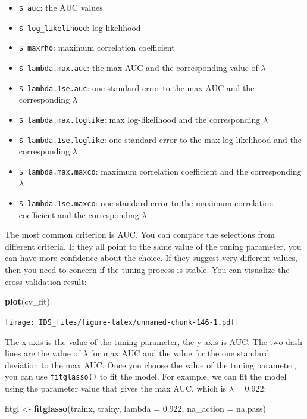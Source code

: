 \documentclass[12pt,]{krantz}
\makeatletter
\newenvironment{Shaded}{\begin{snugshade}}{\end{snugshade}}
\newcommand{\DataTypeTok}[1]{\textcolor[rgb]{0.27,0.27,0.27}{#1}}
\newcommand{\FloatTok}[1]{\textcolor[rgb]{0.06,0.06,0.06}{#1}}
\newcommand{\KeywordTok}[1]{\textcolor[rgb]{0.27,0.27,0.27}{\textbf{#1}}}
\newcommand{\NormalTok}[1]{#1}
\newcommand{\StringTok}[1]{\textcolor[rgb]{0.5,0.5,0.5}{#1}}
\providecommand{\tightlist}{%
  \setlength{\itemsep}{0pt}\setlength{\parskip}{0pt}}
\newenvironment{kframe}{%
\medskip{}
\setlength{\fboxsep}{.8em}
 \def\at@end@of@kframe{}%
 \ifinner\ifhmode%
  \def\at@end@of@kframe{\end{minipage}}%
  \begin{minipage}{\columnwidth}%
 \fi\fi%
 \def\FrameCommand##1{\hskip\@totalleftmargin \hskip-\fboxsep
 \colorbox{shadecolor}{##1}\hskip-\fboxsep
     \hskip-\linewidth \hskip-\@totalleftmargin \hskip\columnwidth}%
 \MakeFramed {\advance\hsize-\width
   \@totalleftmargin\z@ \linewidth\hsize
   \@setminipage}}%
 {\par\unskip\endMakeFramed%
 \at@end@of@kframe}
\renewenvironment{Shaded}{\begin{kframe}}{\end{kframe}}
\makeatother
\begin{document}
\begin{itemize}
\tightlist
\item
  \texttt{\$\ auc}: the AUC values
\item
  \texttt{\$\ log\_likelihood}: log-likelihood
\item
  \texttt{\$\ maxrho}: maximum correlation coefficient
\item
  \texttt{\$\ lambda.max.auc}: the max AUC and the corresponding value of \(\lambda\)
\item
  \texttt{\$\ lambda.1se.auc}: one standard error to the max AUC and the corresponding \(\lambda\)
\item
  \texttt{\$\ lambda.max.loglike}: max log-likelihood and the corresponding \(\lambda\)
\item
  \texttt{\$\ lambda.1se.loglike}: one standard error to the max log-likelihood and the corresponding \(\lambda\)
\item
  \texttt{\$\ lambda.max.maxco}: maximum correlation coefficient and the corresponding \(\lambda\)
\item
  \texttt{\$\ lambda.1se.maxco}: one standard error to the maximum correlation coefficient and the corresponding \(\lambda\)
\end{itemize}

The most common criterion is AUC. You can compare the selections from different criteria. If they all point to the same value of the tuning parameter, you can have more confidence about the choice. If they suggest very different values, then you need to concern if the tuning process is stable. You can visualize the cross validation result:

\begin{Shaded}
\begin{Highlighting}[]
\KeywordTok{plot}\NormalTok{(cv_fit)}
\end{Highlighting}
\end{Shaded}

\texttt{[image: IDS\_files/figure-latex/unnamed-chunk-146-1.pdf]}

The x-axis is the value of the tuning parameter, the y-axis is AUC. The two dash lines are the value of \(\lambda\) for max AUC and the value for the one standard deviation to the max AUC. Once you choose the value of the tuning parameter, you can use \texttt{fitglasso()} to fit the model. For example, we can fit the model using the parameter value that gives the max AUC, which is \(\lambda=0.922\):

\begin{Shaded}
\begin{Highlighting}[]
\NormalTok{fitgl <-}\StringTok{ }\KeywordTok{fitglasso}\NormalTok{(trainx, trainy, }
                   \DataTypeTok{lambda =} \FloatTok{0.922}\NormalTok{, }\DataTypeTok{na_action =}\NormalTok{ na.pass)}
\end{Highlighting}
\end{Shaded}
\end{document}
